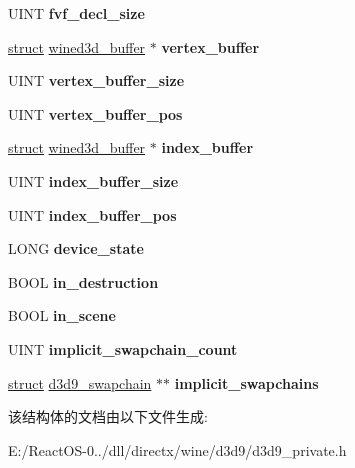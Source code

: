 \begin{DoxyCompactItemize}
U\+I\+NT {\bfseries fvf\+\_\+decl\+\_\+size}
\item 
\mbox{\label{structd3d9__device_a6bb6a80ebf8a4e8c79a69ebc5d77c602}} 
\hyperlink{interfacestruct}{struct} \hyperlink{structwined3d__buffer}{wined3d\+\_\+buffer} $\ast$ {\bfseries vertex\+\_\+buffer}
\item 
\mbox{\label{structd3d9__device_a895061f98efd14f12f65f6d7cf4a575e}} 
U\+I\+NT {\bfseries vertex\+\_\+buffer\+\_\+size}
\item 
\mbox{\label{structd3d9__device_aa7bb50565e7de4f253a25e0f00c95a95}} 
U\+I\+NT {\bfseries vertex\+\_\+buffer\+\_\+pos}
\item 
\mbox{\label{structd3d9__device_a347c2a059026c2c8e5c36b034861e45d}} 
\hyperlink{interfacestruct}{struct} \hyperlink{structwined3d__buffer}{wined3d\+\_\+buffer} $\ast$ {\bfseries index\+\_\+buffer}
\item 
\mbox{\label{structd3d9__device_a1525382c73cadc5e8cbb7568c0ae1b73}} 
U\+I\+NT {\bfseries index\+\_\+buffer\+\_\+size}
\item 
\mbox{\label{structd3d9__device_a22325c8e8c19f11fbfce5c7ef43e5b25}} 
U\+I\+NT {\bfseries index\+\_\+buffer\+\_\+pos}
\item 
\mbox{\label{structd3d9__device_a75f45e8a6f77dbb8b3e28b6a0f7a5284}} 
L\+O\+NG {\bfseries device\+\_\+state}
\item 
\mbox{\label{structd3d9__device_adcf1f6a4652def2e8a8b1c294c8f3c41}} 
B\+O\+OL {\bfseries in\+\_\+destruction}
\item 
\mbox{\label{structd3d9__device_ae363db7dd7d51912c3810e4a9ca83b71}} 
B\+O\+OL {\bfseries in\+\_\+scene}
\item 
\mbox{\label{structd3d9__device_ad6eaa18461e4a7b5d53430566f1e5fa4}} 
U\+I\+NT {\bfseries implicit\+\_\+swapchain\+\_\+count}
\item 
\mbox{\label{structd3d9__device_ad368b337ca44508c1ae0b80b1d1f603c}} 
\hyperlink{interfacestruct}{struct} \hyperlink{structd3d9__swapchain}{d3d9\+\_\+swapchain} $\ast$$\ast$ {\bfseries implicit\+\_\+swapchains}
\end{DoxyCompactItemize}


该结构体的文档由以下文件生成\+:\begin{DoxyCompactItemize}
\item 
E\+:/\+React\+O\+S-\/0../dll/directx/wine/d3d9/d3d9\+\_\+private.\+h\end{DoxyCompactItemize}
